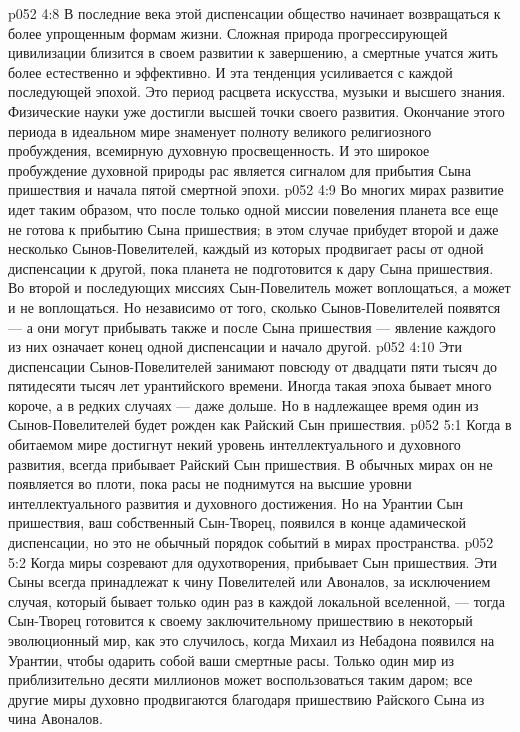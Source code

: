 \vs p052 4:8 В последние века этой диспенсации общество начинает возвращаться к более упрощенным формам жизни. Сложная природа прогрессирующей цивилизации близится в своем развитии к завершению, а смертные учатся жить более естественно и эффективно. И эта тенденция усиливается с каждой последующей эпохой. Это период расцвета искусства, музыки и высшего знания. Физические науки уже достигли высшей точки своего развития. Окончание этого периода в идеальном мире знаменует полноту великого религиозного пробуждения, всемирную духовную просвещенность. И это широкое пробуждение духовной природы рас является сигналом для прибытия Сына пришествия и начала пятой смертной эпохи.
\vs p052 4:9 \pc Во многих мирах развитие идет таким образом, что после только одной миссии повеления планета все еще не готова к прибытию Сына пришествия; в этом случае прибудет второй и даже несколько Сынов\hyp{}Повелителей, каждый из которых продвигает расы от одной диспенсации к другой, пока планета не подготовится к дару Сына пришествия. Во второй и последующих миссиях Сын\hyp{}Повелитель может воплощаться, а может и не воплощаться. Но независимо от того, сколько Сынов\hyp{}Повелителей появятся --- а они могут прибывать также и после Сына пришествия --- явление каждого из них означает конец одной диспенсации и начало другой.
\vs p052 4:10 \pc Эти диспенсации Сынов\hyp{}Повелителей занимают повсюду от двадцати пяти тысяч до пятидесяти тысяч лет урантийского времени. Иногда такая эпоха бывает много короче, а в редких случаях --- даже дольше. Но в надлежащее время один из Сынов\hyp{}Повелителей будет рожден как Райский Сын пришествия.
\vs p052 5:1 Когда в обитаемом мире достигнут некий уровень интеллектуального и духовного развития, всегда прибывает Райский Сын пришествия. В обычных мирах он не появляется во плоти, пока расы не поднимутся на высшие уровни интеллектуального развития и духовного достижения. Но на Урантии Сын пришествия, ваш собственный Сын\hyp{}Творец, появился в конце адамической диспенсации, но это не обычный порядок событий в мирах пространства.
\vs p052 5:2 Когда миры созревают для одухотворения, прибывает Сын пришествия. Эти Сыны всегда принадлежат к чину Повелителей или Авоналов, за исключением случая, который бывает только один раз в каждой локальной вселенной, --- тогда Сын\hyp{}Творец готовится к своему заключительному пришествию в некоторый эволюционный мир, как это случилось, когда Михаил из Небадона появился на Урантии, чтобы одарить собой ваши смертные расы. Только один мир из приблизительно десяти миллионов может воспользоваться таким даром; все другие миры духовно продвигаются благодаря пришествию Райского Сына из чина Авоналов.
